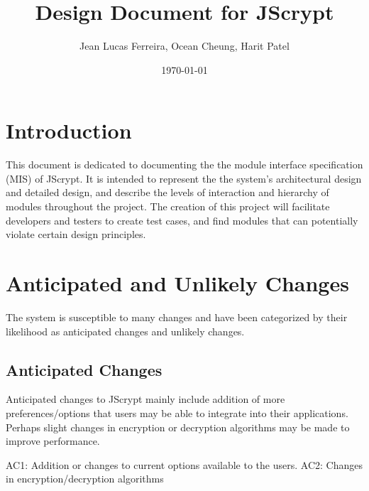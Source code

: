 \documentclass[12pt]{article}
\begin{document}
\title{Design Document for JScrypt}
\author{Jean Lucas Ferreira, Ocean Cheung, Harit Patel}

\date{\today}

\maketitle


\newpage
  \tableofcontents

\newpage


\section*{}
\section{Introduction}

 This document is dedicated to documenting the the module interface specification (MIS) of JScrypt. It is intended to represent the the system’s architectural design and detailed design, and describe the levels of interaction and hierarchy of modules throughout the project. The creation of this project will facilitate developers and testers to create test cases, and find modules that can potentially violate certain design principles.

\section{Anticipated and Unlikely Changes}

The system is susceptible to many changes and have been categorized by their likelihood as anticipated changes and unlikely changes.

\subsection{Anticipated Changes}
Anticipated changes to JScrypt mainly include addition of more preferences/options that users may be able to integrate into their applications. Perhaps slight changes in encryption or decryption algorithms may be made to improve performance. \newline

AC1: Addition or changes to current options available to the users. \newline
AC2: Changes in encryption/decryption algorithms
\end{document}
